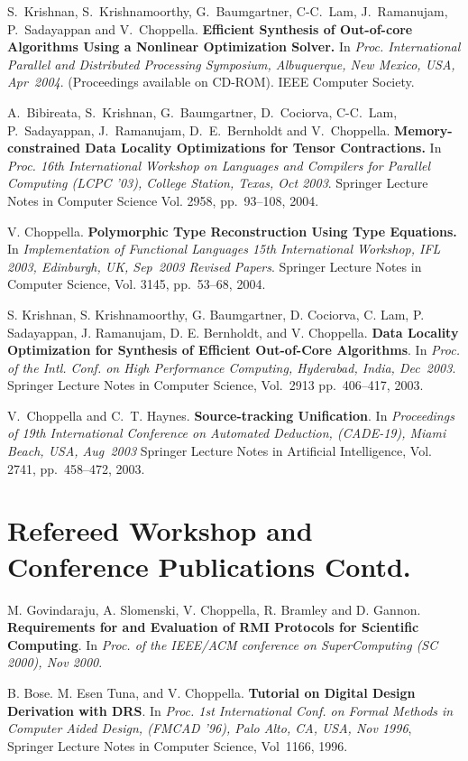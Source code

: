 \documentclass[11pt,margin,line]{res}
\begin{document}
\begin{resume}
S.~Krishnan, S.~Krishnamoorthy, G.~Baumgartner, C-C.~Lam,
J.~Ramanujam, P.~Sadayappan and V.~Choppella.  {\bf
Efficient Synthesis of Out-of-core Algorithms Using a
Nonlinear Optimization Solver.}  In {\em
{Proc. International Parallel and Distributed Processing
Symposium, Albuquerque, New Mexico, USA, Apr~2004}}.
(Proceedings available on CD-ROM).  IEEE Computer Society.

A.~Bibireata, S.~Krishnan, G.~Baumgartner, D.~Cociorva,
C-C.~Lam, P.~Sadayappan, J.~Ramanujam, D.~E.~Bernholdt and
V.~Choppella.  {\bf Memory-constrained Data Locality
Optimizations for Tensor Contractions.}  In {\em {Proc. 16th
International Workshop on Languages and Compilers for
Parallel Computing (LCPC '03), College Station, Texas, Oct
2003}}.  Springer Lecture Notes in Computer Science
Vol. 2958, pp.~93--108, 2004.

V. Choppella.  {\bf Polymorphic Type Reconstruction Using
Type Equations.}  In {\em {Implementation of Functional
Languages 15th International Workshop, IFL 2003, Edinburgh,
UK, Sep~2003 Revised Papers}}.  Springer Lecture Notes in
Computer Science, Vol. 3145, pp.~53--68, 2004.

S. Krishnan, S. Krishnamoorthy, G. Baumgartner, D. Cociorva,
C. Lam, P.  Sadayappan, J. Ramanujam, D. E. Bernholdt, and
V. Choppella.  {\bf Data Locality Optimization for Synthesis
of Efficient Out-of-Core Algorithms}. In {\em {Proc. of the
Intl. Conf. on High Performance Computing, Hyderabad, India,
Dec~2003}}.  Springer Lecture Notes in Computer Science,
Vol.~2913 pp.~406--417, 2003.

V.~Choppella and C.~T. Haynes. {\bf Source-tracking
  Unification}.  In {\em {Proceedings of 19th International
    Conference on Automated Deduction, (CADE-19), Miami
    Beach, USA, Aug~2003}} Springer Lecture Notes in
Artificial Intelligence, Vol. 2741, pp.~458--472, 2003.

\newpage

\section{\sc Refereed Workshop and Conference Publications Contd.}

M. Govindaraju, A. Slomenski, V. Choppella, R. Bramley and
  D. Gannon.  {\bf Requirements for and Evaluation of RMI
  Protocols for Scientific Computing}. In {\em {Proc. of the
  IEEE/ACM conference on SuperComputing (SC 2000), Nov
  2000}}.

B. Bose. M. Esen Tuna, and V. Choppella.  {\bf Tutorial on
Digital Design Derivation with DRS}.  In {\em {Proc. 1st
International Conf. on Formal Methods in Computer Aided
Design, (FMCAD '96), Palo Alto, CA, USA, Nov 1996}},
Springer Lecture Notes in Computer Science, Vol~1166, 1996.


\end{resume}
\end{document}
